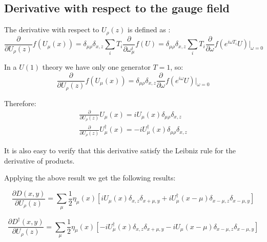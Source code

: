 \documentclass[12pt, a4paper]{article}
\begin{document}
\subsection{Derivative with respect to the gauge field}

The derivative with respect to $U_{\rho}(z)$ is defined as \cite{gattringer2009quantum}:
%
\begin{equation}
\frac{\partial }{\partial U_{\rho}(z)} f(U_\mu(x))
= \delta_{\mu \rho} \delta_{x, z} \sum_i T_i \frac{\partial}{\partial \omega_{\mu}^{i}} f(U)
=  \delta_{\mu \rho} \delta_{x, z}  \sum_i T_i \frac{\partial}{\partial \omega} 
f( e^{i \omega T_i} U)\big\vert_{\omega=0}
\end{equation}

In a $U(1)$ theory we have only one generator $T=1$, so:
\begin{equation}
\frac{\partial }{\partial U_{\rho}(z)} f(U_{\mu}(x))
=  \delta_{\mu \rho} \delta_{x, z}  \frac{\partial}{\partial \omega} f( e^{i \omega} U)\big\vert_{\omega=0}
\end{equation}

Therefore:
\begin{align}
\frac{\partial }{\partial U_{\rho}(z)} U_{\mu}(x) = 
i U_{\mu}(x) \delta_{\mu \rho} \delta_{x, z}
\\
\frac{\partial }{\partial U_{\rho}(z)} U^\dagger_{\mu}(x) = 
-i U^\dagger_{\mu}(x) \delta_{\mu \rho} \delta_{x, z}
\end{align}

It is also easy to verify that this derivative satisfy the Leibniz rule for the derivative of products.

Applying the above result we get the following results:

\begin{equation}
\frac{\partial D(x,y)}{\partial U_{\rho}(z)} 
=  \sum_{\mu} \frac{1}{2} \eta_{\mu}(x) 
    [i U_{\mu}(x) \delta_{x,z} \delta_{x+\mu, y}
     + i U^{\dagger}_{\mu}(x-\mu) \delta_{x-\mu,z} \delta_{x-\mu, y} ]
\end{equation}

\begin{equation}
\frac{\partial D^{\dagger}(x,y)}{\partial U_{\rho}(z)} 
=  \sum_{\mu} \frac{1}{2} \eta_{\mu}(x) 
    [-i U^{\dagger}_{\mu}(x) \delta_{x,z} \delta_{x+\mu, y}
     - i U_{\mu}(x-\mu) \delta_{x-\mu,z} \delta_{x-\mu, y} ]
\end{equation}
\end{document}
